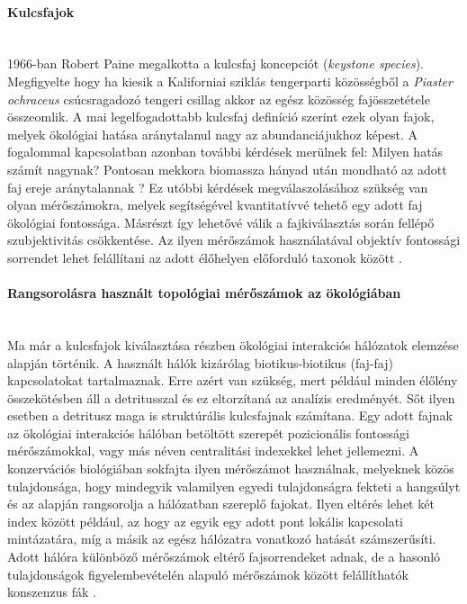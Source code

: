 \documentclass[a4paper,12pt]{article}
\begin{document}
	 \paragraph{Kulcsfajok} \mbox{}\\ %
	 1966-ban Robert Paine megalkotta a kulcsfaj koncepciót (\textit{keystone species}). Megfigyelte hogy ha kiesik a Kaliforniai sziklás tengerparti közösségből a \textit{Piaster ochraceus} csúcsragadozó tengeri csillag akkor az egész közösség fajösszetétele összeomlik. A mai legelfogadottabb kulcsfaj definíció szerint ezek olyan fajok, melyek ökológiai hatása aránytalanul nagy az abundanciájukhoz képest. A fogalommal kapcsolatban azonban további kérdések merülnek fel: Milyen hatás számít nagynak? Pontosan mekkora biomassza hányad után mondható az adott faj ereje aránytalannak \cite{new_zeland}? Ez utóbbi kérdések megválaszolásához szükség van olyan mérőszámokra, melyek segítségével kvantitatívvé tehető egy adott faj ökológiai fontossága. Másrészt így lehetővé válik a fajkiválasztás során fellépő szubjektivitás csökkentése. Az ilyen mérőszámok használatával objektív fontossági sorrendet lehet felállítani az adott élőhelyen előforduló taxonok között \cite{jordan_comparison}.
	 
	 \paragraph{Rangsorolásra használt topológiai mérőszámok az ökológiában} \mbox{}\\
	 Ma már a kulcsfajok kiválasztása részben ökológiai interakciós hálózatok elemzése alapján történik. A használt hálók kizárólag biotikus-biotikus (faj-faj) kapcsolatokat tartalmaznak. Erre azért van szükség, mert például minden élőlény összekötésben áll a detritusszal és ez eltorzítaná az analízis eredményét. Sőt ilyen esetben a detritusz maga is struktúrális kulcsfajnak számítana. Egy adott fajnak az ökológiai interakciós hálóban betöltött szerepét pozicionális fontossági mérőszámokkal, vagy más néven centralitási indexekkel lehet jellemezni. A konzervációs biológiában sokfajta ilyen mérőszámot használnak, melyeknek közös tulajdonsága, hogy mindegyik valamilyen egyedi tulajdonságra fekteti a hangsúlyt és az alapján rangsorolja a hálózatban szereplő fajokat. Ilyen eltérés lehet két index között például, az hogy az egyik egy adott pont lokális kapcsolati mintázatára, míg a másik az egész hálózatra vonatkozó hatását számszerűsíti. Adott hálóra különböző mérőszámok eltérő fajsorrendeket adnak, de a hasonló tulajdonságok figyelembevételén alapuló mérőszámok között felállíthatók konszenzus fák \cite{jordan_comparison}.
	 
\end{document}
